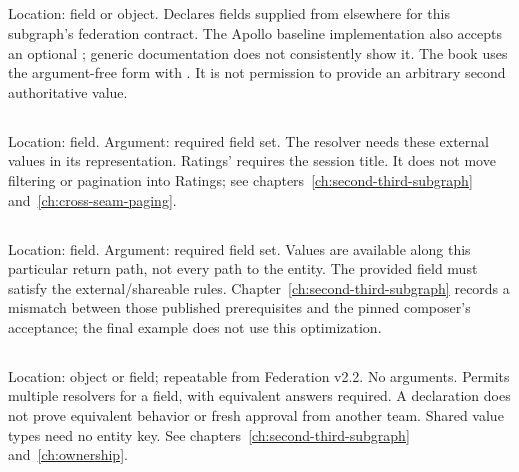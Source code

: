 \subsection*{}

Location: field or object. Declares fields supplied from elsewhere for this
subgraph's federation contract. The Apollo baseline implementation also
accepts an optional ; generic documentation does not consistently
show it. The book uses the argument-free form with .
It is not permission to provide an arbitrary second authoritative value.

\subsection*{}

Location: field. Argument: required  field set.
The resolver needs these external values in its representation.
Ratings'  requires the session title. It does not move
filtering or pagination into Ratings; see
chapters~\ref{ch:second-third-subgraph} and~\ref{ch:cross-seam-paging}.

\subsection*{}

Location: field. Argument: required  field set.
Values are available along this particular return path, not every path to
the entity. The provided field must satisfy the external/shareable rules.
Chapter~\ref{ch:second-third-subgraph} records a mismatch between those
published prerequisites and the pinned composer's acceptance; the final
example does not use this optimization.

\subsection*{}

Location: object or field; repeatable from Federation v2.2. No arguments.
Permits multiple resolvers for a field, with equivalent answers required.
A declaration does not prove equivalent behavior or fresh approval from
another team. Shared value types need no entity key.
See chapters~\ref{ch:second-third-subgraph} and~\ref{ch:ownership}.

\subsection*{}

